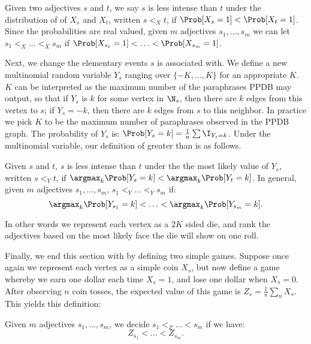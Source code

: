\theoremstyle{definition}
\begin{definition}
Given two adjectives $s$ and $t$, we say $s$ is less intense than $t$ under the distribution of of $X_s$ and $X_t$, written $s <_{X} t$, if $\Prob[X_s = 1] < \Prob[X_t = 1]$. Since the probabilities are real valued, given $m$ adjectives $s_1, \ldots, s_m$ we can let $s_1 <_X \ldots <_X s_m$ if $\Prob[X_{s_1} = 1] < \ldots < \Prob[X_{s_m} = 1]$.
\end{definition}

Next, we change the elementary events $s$ is associated with. We define a new multinomial random variable $Y_s$ ranging over $\{-K,\ldots,K\}$ for an appropriate $K$. $K$ can be interpreted as the maximum number of the paraphrases PPDB may output, so that if $Y_s$ is $k$ for some vertex in $\N_s$, then there are $k$ edges from this vertex to $s$; if $Y_s = -k$, then there are $k$ edges from $s$ to this neighbor. In practice we pick $K$ to be the maximum number of paraphrases observed in the PPDB graph. The probability of $Y_s$ is: $\Prob[Y_s = k] = \frac{1}{n} \sum \I_{Y_s = k}$. Under the multinomial variable, our definition of greater than is as follows.

 \theoremstyle{definition}
\begin{definition}
Given $s$ and $t$, $s$ is less intense than $t$ under the the most likely value of $Y_s$, written $s <_Y t$, if $\argmax_{k} \Prob[Y_s = k] < \argmax_{k} \Prob[Y_t = k]$. In general, given $m$ adjectives $s_1, \ldots, s_m$, $s_1 <_Y \ldots <_Y s_m$ if:
	\[
		\argmax_{k} \Prob[Y_{s_1} = k] < \ldots < \argmax_{k} \Prob[Y_{s_m} = k].
	\]
\end{definition}

In other words we represent each vertex as a $2K$ sided die, and rank the adjectives based on the most likely face the die will show on one roll.

Finally, we end this section with by defining two simple games. Suppose once again we represent each vertex as a simple coin $X_s$, but now define a game whereby we earn one dollar each time $X_s = 1$, and lose one dollar when $X_s = 0$. After observing $n$ coin tosses, the expected value of this game is $Z_s = \frac{1}{n} \sum_n X_{s}$. This yields this definition:

\theoremstyle{definition}
\begin{definition}
Given $m$ adjectives $s_1, \ldots, s_m$, we decide $s_1 <_{Z} \ldots < s_m$ if we have:
	\[
		Z_{s_1} < \ldots < Z_{s_m}.
	\]
\end{definition}


